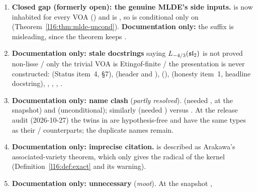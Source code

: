 \begin{enumerate}
  bounded multiplicity in the disc (Proposition~\ref{l16:prop:weak}, on paper). Fix: state them as growth results, or use the
  $E_4,E_6$ route.
\item \textbf{Closed gap (formerly open): the genuine MLDE's side inputs.}  is now inhabited for every
  VOA () and  is , so
  \allowbreak{}\allowbreak{}\allowbreak{}\allowbreak{}
  is conditional only on  (Theorem~\ref{l16:thm:mlde-uncond}). \textbf{Documentation only:} the
  suffix  is misleading, since the theorem keeps .
\item \textbf{Documentation only: stale docstrings} saying $L_{-4/3}(\mathfrak{sl}_2)$ is not proved non-lisse / only the trivial VOA is
  Etingof-finite / the presentation is never constructed:  (Status item~4, \S7),
   (header and \allowbreak{}\allowbreak{}), 
  (\allowbreak{}\allowbreak{}\allowbreak{}\allowbreak{}),  (honesty item~1, headline docstring),
  , , ,
  .
\item \textbf{Documentation only: name clash} (\emph{partly resolved}). \allowbreak{}\allowbreak{} (needed ,  at the snapshot) and
  \allowbreak{}\allowbreak{} (unconditional); similarly \allowbreak{}\allowbreak{}
  (needed ) versus \allowbreak{}\allowbreak{}. At the release audit (2026-10-27) the
   twins in  are hypothesis-free and have the same types as their
  / counterparts; the duplicate names remain.
\item \textbf{Documentation only: imprecise citation.}  is described as Arakawa's associated-variety theorem, which only
  gives the radical of the kernel (Definition~\ref{l16:def:exact} and its warning).
\item \textbf{Documentation only: unnecessary } (\emph{moot}). At the snapshot \allowbreak{}\allowbreak{},

\end{enumerate}

